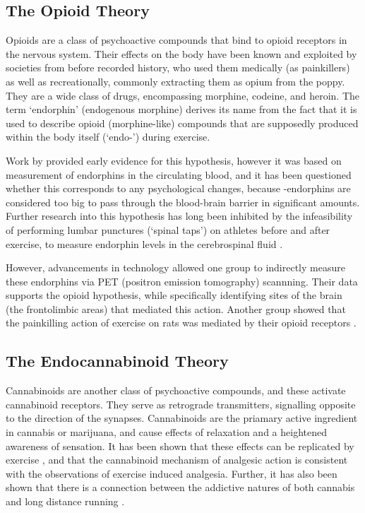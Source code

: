 \documentclass[twocolumn]{article}
\begin{document}
	\subsection{The Opioid Theory}	
	Opioids are a class of psychoactive compounds that bind to opioid receptors in the nervous system. Their effects on the body have been known and exploited by societies from before recorded history, who used them medically (as painkillers) as well as recreationally, commonly extracting them as opium from the poppy. They are a wide class of drugs, encompassing morphine, codeine, and heroin. The term `endorphin' (endogenous morphine) derives its name from the fact that it is used to describe opioid (morphine-like) compounds that are supposedly produced within the body itself (`endo-') during exercise.

	Work by \citep{endorphin} provided early evidence for this hypothesis, however it was based on measurement of endorphins in the circulating blood, and it has been questioned \citep{endocan} whether this corresponds to any psychological changes, because \textbeta -endorphins are considered too big to pass through the blood-brain barrier in significant amounts. Further research into this hypothesis has long been inhibited by the infeasibility of performing lumbar punctures (`spinal taps') on athletes before and after exercise, to measure endorphin levels in the cerebrospinal fluid \citep{overview}.
	
	However, advancements in technology allowed one group \citep{opioid} to indirectly measure these endorphins via PET (positron emission tomography) scannning. Their data supports the opioid hypothesis, while specifically identifying sites of the brain (the frontolimbic areas) that mediated this action. Another group showed that the painkilling action of exercise on rats was mediated by their opioid receptors \citep{ratrun}.
	
	\subsection{The Endocannabinoid Theory}
	
	Cannabinoids are another class of psychoactive compounds, and these activate cannabinoid receptors. They serve as retrograde transmitters, signalling opposite to the direction of the synapses. Cannabinoids are the priamary active ingredient in cannabis or marijuana, and cause effects of relaxation and a heightened awareness of sensation.
	It has been shown that these effects can be replicated by exercise \citep{endocan}, and that the cannabinoid mechanism of analgesic action is consistent with the observations of exercise induced analgesia. Further, it has also been shown that there is a connection between the addictive natures of both cannabis and long distance running \citep{endocan}.
	
\end{document}
